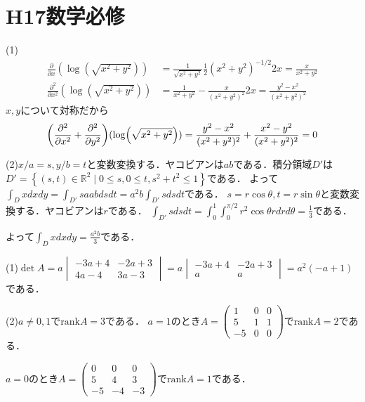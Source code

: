 \documentclass[
		book,
		head_space=20mm,
		foot_space=20mm,
		gutter=10mm,
		line_length=190mm
]{jlreq}
\begin{document}
\section{H17数学必修}
(1)\begin{align}
\frac{\partial }{\partial x} (\log(\sqrt{x^2+y^2}))&=\frac{1}{\sqrt{x^2+y^2}}\frac{1}{2}(x^2+y^2)^{-1/2}2x=\frac{x}{x^2+y^2}\\
\frac{\partial^2}{\partial x^2}(\log(\sqrt{x^2+y^2}))&=\frac{1}{x^2+y^2}-\frac{x}{(x^2+y^2)^2}2x=\frac{y^2-x^2}{(x^2+y^2)^2}
\end{align}
$x,y$について対称だから\begin{equation}
    \qty(\frac{\partial^2}{\partial x^2}+\frac{\partial^2}{\partial y^2})(\log(\sqrt{x^2+y^2}))=\frac{y^2-x^2}{(x^2+y^2)^2}+\frac{x^2-y^2}{(x^2+y^2)^2}=0
\end{equation}

(2)$x/a=s,y/b=t$と変数変換する．ヤコビアンは$ab$である．積分領域$D'$は$D'=\left\{ (s,t)\in \mathbb{R}^2 \mid 0\le s, 0\le t, s^2+t^2\le 1 \right\}$である．
よって$\int_D x dxdy=\int_{D'} sa ab dsdt=a^2b \int_{D'} s dsdt$である．
$s=r\cos \theta,t=r\sin \theta$と変数変換する．ヤコビアンは$r$である．
$\int_{D'} sdsdt = \int_0^1\int_0^{\pi/2} r^2\cos \theta rdrd\theta=\frac{1}{3}$である．

よって$\int_D xdxdy= \frac{a^2b}{3}$である．

(1)$\det A = a \begin{vmatrix}
    -3a+4 & -2a+3\\
    4a-4 & 3a-3
\end{vmatrix}=a \begin{vmatrix}
    -3a+4 & -2a+3\\
    a & a
    \end{vmatrix}=a^2(-a+1)$である．

(2)$a\neq 0,1$で$\mathrm{rank} A = 3$である．
$a=1$のとき$A=\begin{pmatrix}
    1 & 0 & 0 \\
    5 & 1 & 1\\
    -5 & 0 & 0
\end{pmatrix}$で$\mathrm{rank} A = 2$である．

$a=0$のとき$A=\begin{pmatrix}
    0 & 0 & 0 \\
    5 & 4 & 3\\
    -5 & -4 & -3
\end{pmatrix}$で$\mathrm{rank} A = 1$である．
\end{document}
